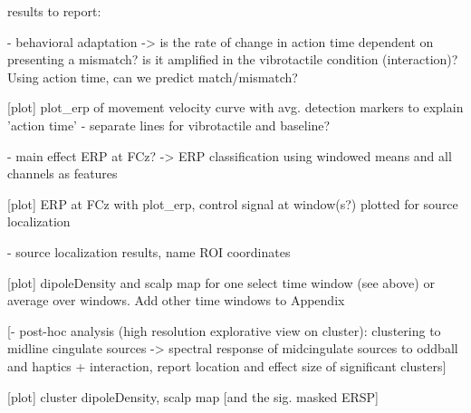 

results to report:

- behavioral adaptation -> is the rate of change in action time dependent on presenting a mismatch? is it amplified in the vibrotactile condition (interaction)? Using action time, can we predict match/mismatch?

[plot] plot_erp of movement velocity curve with avg. detection markers to explain 'action time'
    - separate lines for vibrotactile and baseline?

- main effect ERP at FCz? -> ERP classification using windowed means and all channels as features

[plot] ERP at FCz with plot_erp, control signal at window(s?) plotted for source localization

- source localization results, name ROI coordinates

[plot] dipoleDensity and scalp map for one select time window (see above) or average over windows. Add other time windows to Appendix

[- post-hoc analysis (high resolution explorative view on cluster): clustering to midline cingulate sources -> spectral response of midcingulate sources to oddball and haptics + interaction, report location and effect size of significant clusters]

[plot] cluster dipoleDensity, scalp map [and the sig. masked ERSP]